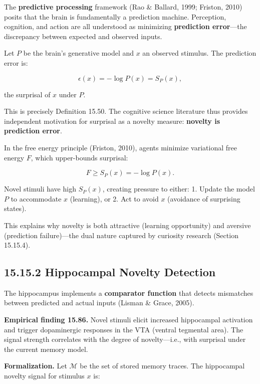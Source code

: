 The \textbf{predictive processing} framework (Rao \& Ballard, 1999; Friston, 2010) posits that the brain is fundamentally a prediction machine. Perception, cognition, and action are all understood as minimizing \textbf{prediction error}---the discrepancy between expected and observed inputs.

\begin{definition}
Let $P$ be the brain's generative model and $x$ an observed stimulus. The prediction error is:

\[\epsilon(x) = -\log P(x) = S_P(x),\]

the surprisal of $x$ under $P$.

This is precisely Definition 15.50. The cognitive science literature thus provides independent motivation for surprisal as a novelty measure: \textbf{novelty is prediction error}.
\end{definition}

\begin{proposition}
In the free energy principle (Friston, 2010), agents minimize variational free energy $F$, which upper-bounds surprisal:

\[F \geq S_P(x) = -\log P(x).\]

Novel stimuli have high $S_P(x)$, creating pressure to either:
1. Update the model $P$ to accommodate $x$ (learning), or
2. Act to avoid $x$ (avoidance of surprising states).

This explains why novelty is both attractive (learning opportunity) and aversive (prediction failure)---the dual nature captured by curiosity research (Section 15.15.4).
\end{proposition}

\subsection{15.15.2 Hippocampal Novelty Detection}

The hippocampus implements a \textbf{comparator function} that detects mismatches between predicted and actual inputs (Lisman \& Grace, 2005).

\textbf{Empirical finding 15.86.} Novel stimuli elicit increased hippocampal activation and trigger dopaminergic responses in the VTA (ventral tegmental area). The signal strength correlates with the degree of novelty---i.e., with surprisal under the current memory model.

\textbf{Formalization.} Let $\mathcal{M}$ be the set of stored memory traces. The hippocampal novelty signal for stimulus $x$ is:

